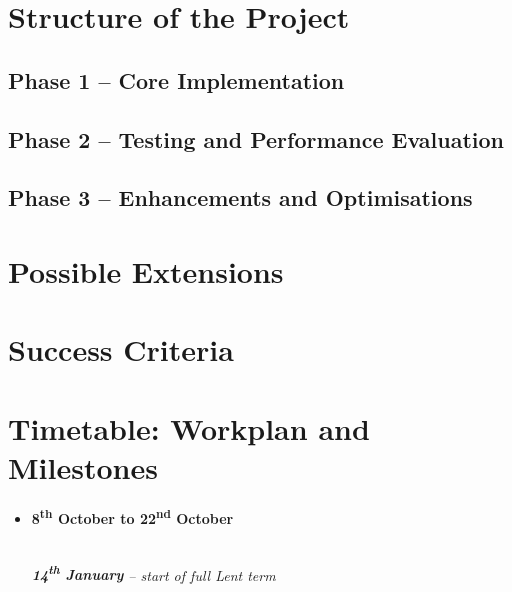\section*{Structure of the Project}

\subsection*{Phase 1 -- Core Implementation}
\label{subsec:structure-phase1}

\subsection*{Phase 2 -- Testing and Performance Evaluation}
\label{subsec:structure-phase2}

\subsection*{Phase 3 -- Enhancements and Optimisations}

\section*{Possible Extensions}
\label{sec:extensions}

\section*{Success Criteria}

\section*{Timetable: Workplan and Milestones}

\newcommand{\workpackage}[3]{\item \textbf{#1} #2 #3}
\newcommand{\milestone}[1]{\textbf{Milestone:} #1}
\newcommand{\wpstartfill}[0]{\hfill \\ \\}
\newcommand{\wpendfill}[0]{\hfill \\}

\begin{itemize}

	\workpackage{8\textsuperscript{th} October to 22\textsuperscript{nd} October}{\begin{itemize}
		\end{itemize}
		\wpendfill
	}{}
	\textit{\textbf{14\textsuperscript{th} January} -- start of full Lent term}	\\
	
\end{itemize}
